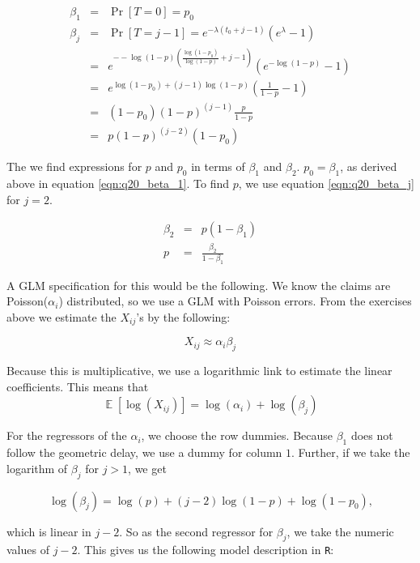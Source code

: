 \documentclass[11pt]{article}
\DeclareMathOperator{\E}{\mathbb{E}}
\begin{document}
\begin{eqnarray}
\beta_{1} &=& \Pr[T=0] = p_{0} \label{eqn:q20_beta_1} \\
\beta_{j} &=& \Pr[T=j-1] = e^{-\lambda(t_{0}+j-1)}(e^{\lambda}-1)\\
          &=& e^{--\log(1-p)(\frac{\log(1 - p_{0})}{\log(1-p)}+j-1)}(e^{-\log(1-p)}-1) \\
          &=& e^{\log(1-p_{0}) +(j-1)\log(1-p)}(\frac{1}{1-p}-1) \\
          &=& (1-p_{0})(1-p)^{(j-1)}\frac{p}{1-p} \\
          &=& p(1-p)^{(j-2)}(1-p_{0}) \label{eqn:q20_beta_j}
\end{eqnarray}

The we find expressions for $p$ and $p_{0}$ in terms of $\beta_{1}$ and $\beta_{2}$. $p_{0} = \beta_{1}$, as derived above in equation \ref{eqn:q20_beta_1}. To find $p$, we use equation \ref{eqn:q20_beta_j} for $j=2$.

\begin{eqnarray}
\beta_{2} &=& p(1-\beta_{1}) \\
p &=& \frac{\beta_{2}}{1-\beta_{1}}
\end{eqnarray}

A GLM specification for this would be the following. We know the claims are Poisson($\alpha_{i}$) distributed, so we use a GLM with Poisson errors. From the exercises above we estimate the $X_{ij}$'s by the following:

\begin{equation}
X_{ij} \approx \alpha_{i}\beta_{j}
\end{equation}

Because this is multiplicative, we use a logarithmic link to estimate the linear coefficients. This means that \begin{equation}
\E[\log(X_{ij})] = \log(\alpha_{i}) + \log(\beta_{j})
\end{equation}

For the regressors of the $\alpha_{i}$, we choose the row dummies. Because $\beta_{1}$ does not follow the geometric delay, we use a dummy for column $1$. Further, if we take the logarithm of $\beta_{j}$ for $j>1$, we get

\begin{equation}
\log(\beta_{j}) = \log(p) + (j-2)\log(1-p) + \log(1-p_{0}) \mbox{,}
\end{equation}

which is linear in $j-2$. So as the second regressor for $\beta_{j}$, we take the numeric values of $j-2$. This gives us the following model description in \verb|R|:
\end{document}
